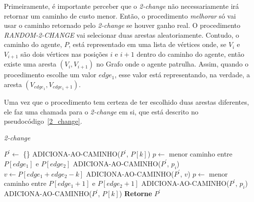 Primeiramente, é importante perceber que o \textit{2-change} não necessariamente 
irá retornar um caminho de custo menor. Então, o procedimento \textit{melhorar} 
só vai usar o caminho retornado pelo \textit{2-change} se houver ganho real. O 
procedimento \textit{RANDOM-2-CHANGE} vai selecionar duas arestas aleatoriamente. 
Contudo, o caminho do agente, $P$, está representado em uma lista de vértices 
onde, se $V_{i}$ e $V_{i+1}$ são dois vértices nas posições $i$ e $i+1$ dentro do 
caminho do agente, então existe uma aresta $(V_{i}, V_{i+1})$ no Grafo onde o 
agente patrulha. Assim, quando o procedimento escolhe um valor $edge_{1}$, esse 
valor está representando, na verdade, a aresta $(V_{edge_{1}}, V_{edge_{1}+1})$.

Uma vez que o procedimento tem certeza de ter escolhido duas arestas diferentes, 
ele faz uma chamada para o \textit{2-change} em si, que está descrito no 
pseudocódigo~\ref{2_change}.

\begin{algorithm}                  %
	\caption{\textit{2-change}}          %
	\label{2_change}                           %
	\begin{algorithmic}[1]                    %
		\newline
		\State $P^{\prime}  \gets $ \{\} 
		 
				\State ADICIONA-AO-CAMINHO($P^{\prime}$, $P[k]$) 
				\State $p \gets $ menor caminho entre $P[edge_{1}]$ e $P[edge_{2}]$
					\State ADICIONA-AO-CAMINHO($P^{\prime}$, $p_{i}$)
				\EndFor
				\State $v \gets P[edge_{1} + edge_{2} - k]$ 
				\State ADICIONA-AO-CAMINHO($P^{\prime}$, $v$)
				\State $p \gets $ menor caminho entre $P[edge_{1}+1]$ e $P[edge_{2}+1]$
					\State ADICIONA-AO-CAMINHO($P^{\prime}$, $p_{i}$)
				\EndFor
			\Else
				\State ADICIONA-AO-CAMINHO($P^{\prime}$, $P[k]$)
			\EndIf
		\EndFor
		\State \textbf{Retorne} $P^{\prime}$
		\EndProcedure
	\end{algorithmic}
\end{algorithm}

